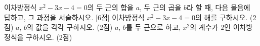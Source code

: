 이차방정식 $x^2-3x-4=0$의 두 근의 합을 $a$, 두 근의 곱을 $b$라 할 때, 다음 물음에 답하고, 그 과정을 서술하시오. \mbox{[6점]}
 이차방정식 $x^2-3x-4=0$의 해를 구하시오. (2점)
 $a$, $b$의 값을 각각 구하시오. (2점)
 $a$, $b$를 두 근으로 하고, $x^2$의 계수가 $2$인 이차방정식을 구하시오. (2점)
